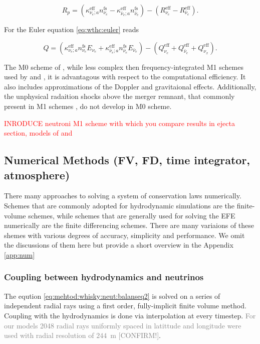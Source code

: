 \documentclass[11pt,a4paper,headinclude=true,DIV=14,BCOR=8mm,chapterprefix,listof=totoc,twoside,openright,abstracton]{scrbook}
\newcommand{\red}[1]{\textcolor{red}{#1}}
\newcommand{\gray}[1]{\textcolor{gray}{#1}}
\begin{document}
\begin{equation}
R_p = (\kappa_{\nu_e;a}^{\text{eff}}n_{\nu_e}^{\text{fs}} - \kappa_{\bar{\nu}_e;a}^{\text{eff}}n_{\bar{\nu}_e}^{\text{fs}}) - (R_{\nu_e}^{\text{eff}} - R_{\bar{\nu}_e}^{\text{eff}}).
\end{equation}

For the Euler equation \eqref{eq:wthc:euler} reads

\begin{equation}
Q = (\kappa_{\nu_e;a}^{\text{eff}}n_{\nu_e}^{\text{fs}}E_{\nu_e} + 
\kappa_{\bar{\nu}_e;a}^{\text{eff}}n_{\bar{\nu}_e}^{\text{fs}}E_{\bar{\nu}_e}) - 
(Q_{\nu_e}^{\text{eff}} + Q_{\bar{\nu}_e}^{\text{eff}} + Q_{\nu_x}^{\text{eff}}).
\end{equation}

The M0 scheme of \cite{Radice:2016dwd}, while less complex then frequency-integrated M1 schemes used by 
\cite{Sekiguchi:2015dma} and \cite{Foucart:2015vpa}, it is advantagous with respect to the computational efficiency.
It also includes approximations of the Doppler and gravitaional effects. 
Additionally, the unphysical radaition shocks above the merger remnant, that commonly present in M1 schemes \cite{Foucart:2018gis}, do not develop in M0 scheme.



\red{INRODUCE neutroni M1 scheme with which you compare results 
in ejecta section, models of \citet{Sekiguchi:2016bjd} 
and \citet{Vincent:2019kor}}


\subsection{Numerical Methods (FV, FD, time integrator, atmosphere)}


There many approaches to solving a system of conservation laws numerically.
Schemes that are commonly adopted for hydrodynamic simulations are the finite-volume schemes, while schemes that are generally used for solving the EFE numerically are the finite differencing schemes. There are many variaions of these shemes with various degrees of accuracy, simplicity and performance. We omit the discussions of them here but provide a short overview in the Appendix \ref{app:num}


\subsubsection{Coupling between hydrodynamics and neutrinos}


The eqution \eqref{eq:mehtod:whisky:neut:balanseq2} is solved on a series of independent radial rays using a first order, fully-implicit finite volume method.
Coupling with the hydrodynamics is done via interpolation at every timestep.
\gray{For our models 2048 radial rays uniformly spaced in latittude and longitude were used with radial resolution of $244$~m [CONFIRM!]}.
\end{document}
